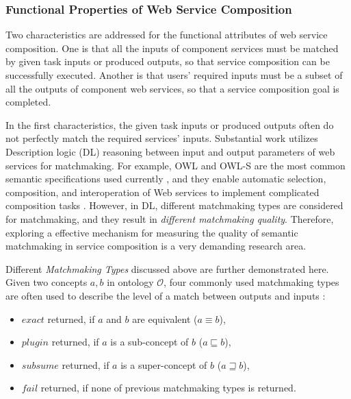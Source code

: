 \subsubsection{Functional Properties of Web Service Composition}
Two characteristics are addressed for the functional attributes of web service composition. One is that all the inputs of component services must be matched by given task inputs or produced outputs, so that service composition can be successfully executed. Another is that users' required inputs must be a subset of all the outputs of component web services, so that a service composition goal is completed. 

In the first characteristics, the given task inputs or produced outputs often do not perfectly match the required services' inputs. Substantial work \cite{bansal2016generalized,lecue2009optimizing, lecue2007making, lecue2006formal, rao2005semantic} utilizes Description logic (DL) reasoning between input and output parameters of web services for matchmaking. For example, OWL and OWL-S are the most common semantic specifications used currently \cite{petrie2016web}, and they enable automatic selection, composition, and interoperation of Web services to implement complicated composition tasks \cite{martin2004owl}. However, in DL, different matchmaking types are considered for matchmaking, and they result in \emph{different matchmaking quality}. Therefore, exploring a effective mechanism for measuring the quality of semantic matchmaking in service composition is a very demanding research area.

Different \emph{Matchmaking Types} discussed above are further demonstrated here. Given two concepts $a, b$ in ontology $\mathcal{O}$, four commonly used matchmaking types are often used to describe the level of a match between outputs and inputs \cite{paolucci2002semantic}: 
\begin{itemize}
\item $exact$ returned, if $a$ and $b$ are equivalent ($a \equiv b$), 
\item $plugin$ returned, if $a$ is a sub-concept of $b$ ($a \sqsubseteq b$),
\item $subsume$ returned, if $a$ is a super-concept of $b$ ($a \sqsupseteq b$), 
\item $fail$ returned, if none of previous matchmaking types is returned. 
\end{itemize}


